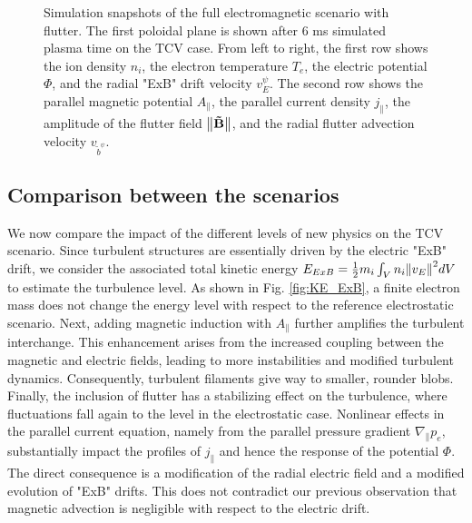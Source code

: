 \begin{figure}[H]\centering
	\centering
	\caption[Simulation snapshots of the full electromagnetic scenario with flutter]{Simulation snapshots of the full electromagnetic scenario with flutter. The first poloidal plane is shown after 6 ms simulated plasma time on the TCV case. From left to right, the first row shows the ion density $n_i$, the electron temperature $T_e$, the electric potential $\Phi$, and the radial "ExB" drift velocity $v_E^\psi$. The second row shows the parallel magnetic potential $A_\parallel$, the parallel current density $j_\parallel$, the amplitude of the flutter field $\norm{\mathbf{\tilde{B}}}$, and the radial flutter advection velocity $v_{\tilde{b}^\psi}$.}
	\label{fig:EMsnapshots}
\end{figure}



\subsection{Comparison between the scenarios}

We now compare the impact of the different levels of new physics on the TCV scenario. Since turbulent structures are essentially driven by the electric "ExB" drift, we consider the associated total kinetic energy $E_{ExB} = \frac{1}{2}m_i \int_V n_i \norm{v_E}^2 dV$ to estimate the turbulence level. As shown in Fig. \ref{fig:KE_ExB}, a finite electron mass does not change the energy level with respect to the reference electrostatic scenario. Next, adding magnetic induction with $A_\parallel$ further amplifies the turbulent interchange. This enhancement arises from the increased coupling between the magnetic and electric fields, leading to more instabilities and modified turbulent dynamics. Consequently, turbulent filaments give way to smaller, rounder blobs. Finally, the inclusion of flutter has a stabilizing effect on the turbulence, where fluctuations fall again to the level in the electrostatic case. Nonlinear effects in the parallel current equation, namely from the parallel pressure gradient $\nabla_\parallel p_e$, substantially impact the profiles of $j_\parallel$ and hence the response of the potential $\Phi$. The direct consequence is a modification of the radial electric field and a modified evolution of "ExB" drifts. This does not contradict our previous observation that magnetic advection is negligible with respect to the electric drift. \newline

